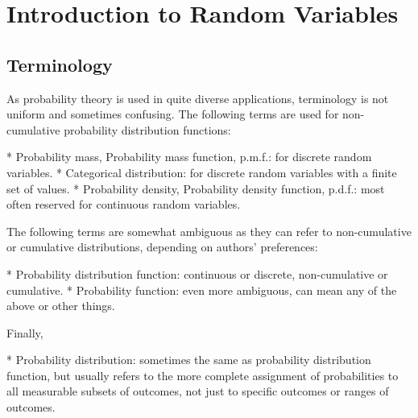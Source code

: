 
\chapter{Introduction to Random Variables}
\section{Terminology}
As probability theory is used in quite diverse applications, terminology is not uniform and sometimes confusing. The following terms are used for non-cumulative probability distribution functions:
\begin{itemize}
* Probability mass, Probability mass function, p.m.f.: for discrete random variables.
*  Categorical distribution: for discrete random variables with a finite set of values.
*  Probability density, Probability density function, p.d.f.: most often reserved for continuous random variables.
\end{itemize}
The following terms are somewhat ambiguous as they can refer to non-cumulative or cumulative distributions, depending on authors' preferences:
\begin{itemize}
* Probability distribution function: continuous or discrete, non-cumulative or cumulative.
*  Probability function: even more ambiguous, can mean any of the above or other things.
\end{itemize}Finally,
\begin{itemize}
*  Probability distribution: sometimes the same as probability distribution function, but usually refers to the more complete assignment of probabilities to all measurable subsets of outcomes, not just to specific outcomes or ranges of outcomes.
\end{itemize}



